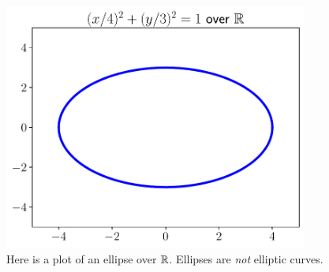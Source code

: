 \begin{figure}[t]
\centering
    \includegraphics[width=10cm]{plots/ellipse/ellipse_reals_4_3.pdf}
    \caption[Plot of an ellipse over the reals]{Here
        is a plot of an ellipse over $\mathbb{R}$.
        Ellipses are \emph{not} \glspl{elliptic curve}.}
    \label{fig:ellipse_plot}
\end{figure}
